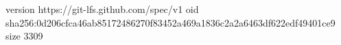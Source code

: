 version https://git-lfs.github.com/spec/v1
oid sha256:0d206cfca46ab85172486270f83452a469a1836c2a2a6463df622edf49401ce9
size 3309
